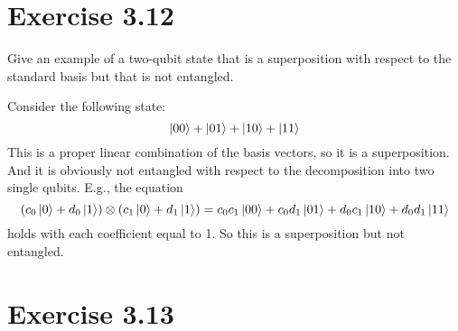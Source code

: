 \documentclass[11pt]{article}
\begin{document}
\section*{Exercise 3.12}

Give an example of a two-qubit state that is a superposition with respect
to the standard basis but that is not entangled.

Consider the following state:
$$\ket{00} + \ket{01} + \ket{10} + \ket{11}$$
This is a proper linear combination of the basis vectors, so it is a superposition.
And it is obviously not entangled with respect to the decomposition into two single qubits.
E.g., the equation $$(c_0\ket{0} + d_0\ket{1}) \otimes (c_1\ket{0} + d_1\ket{1}) = c_0c_1\ket{00} + 
c_0d_1\ket{01} + d_0c_1\ket{10} + d_0d_1\ket{11}$$
holds with each coefficient equal to 1. So this is a superposition but not entangled.

\section*{Exercise 3.13}
\end{document}
